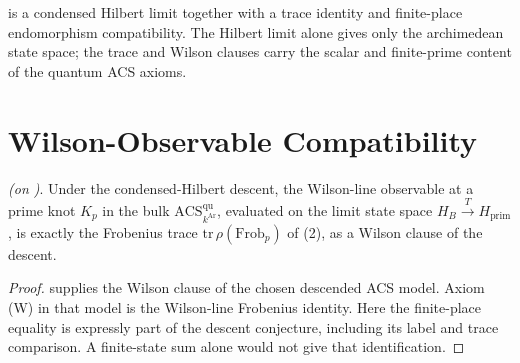 \begin{remark}
\label{v4-arith:w10-a:rem:named-theorem}
 is a condensed Hilbert
limit together with a trace identity and finite-place endomorphism
compatibility. The Hilbert limit alone gives only the archimedean
state space; the trace and Wilson clauses carry the scalar and
finite-prime content of the quantum ACS axioms.
\end{remark}

\section{Wilson-Observable Compatibility}
\label{v4-arith:w10-a:wilson-compat}

\begin{theorem}
\label{v4-arith:w10-a:thm:wilson-line-compat}
\ClaimStatusProvedHereConditional \emph{(on
)}. Under the
condensed-Hilbert descent, the Wilson-line observable at a prime
knot \(K_{p}\) in the bulk \(\mathrm{ACS}^{\mathrm{qu}}_{k^{\mathrm{Ar}}}\),
evaluated on the limit state space
\(H_B\xrightarrow{T}H_{\mathrm{prim}}\),
is exactly the Frobenius trace \(\mathrm{tr}\,\rho(\mathrm{Frob}_{p})\)
of (2), as a Wilson clause of the
descent.
\end{theorem}

\begin{proof}
 supplies the Wilson
clause of the chosen descended ACS model. Axiom (W) in that model is
the Wilson-line Frobenius identity. Here the finite-place equality is expressly part of the descent
conjecture, including its label and trace comparison. A finite-state
sum alone would not give that identification.
\end{proof}

